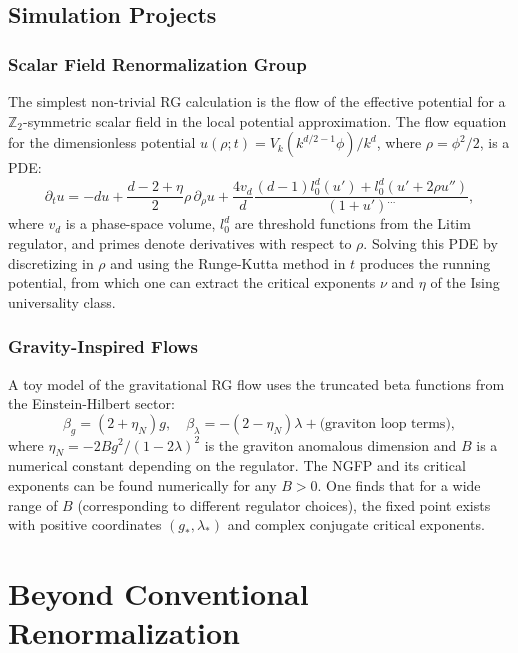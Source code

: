 \documentclass[12pt,a4paper,oneside]{book}
\theoremstyle{definition}
\theoremstyle{plain}
\theoremstyle{remark}
\begin{document}
\chapter{Simulation Projects}

\section{Scalar Field Renormalization Group}

The simplest non-trivial RG calculation is the flow of the effective potential
for a $\mathbb{Z}_2$-symmetric scalar field in the local potential approximation.
The flow equation for the dimensionless potential $u(\rho; t) = V_k(k^{d/2-1}\phi)/k^d$,
where $\rho = \phi^2/2$, is a PDE:
\begin{equation}
\partial_t u = -du + \frac{d-2+\eta}{2}\rho\,\partial_\rho u
+ \frac{4v_d}{d}\frac{(d-1)l_0^d(u') + l_0^d(u' + 2\rho u'')}{(1+u')^{...}},
\end{equation}
where $v_d$ is a phase-space volume, $l_0^d$ are threshold functions from
the Litim regulator, and primes denote derivatives with respect to $\rho$.
Solving this PDE by discretizing in $\rho$ and using the Runge-Kutta method
in $t$ produces the running potential, from which one can extract the
critical exponents $\nu$ and $\eta$ of the Ising universality class.

\section{Gravity-Inspired Flows}

A toy model of the gravitational RG flow uses the truncated beta functions
from the Einstein-Hilbert sector:
\begin{equation}
\beta_g = (2 + \eta_N)g, \quad
\beta_\lambda = -(2-\eta_N)\lambda + \text{(graviton loop terms)},
\end{equation}
where $\eta_N = -2Bg^2/(1-2\lambda)^2$ is the graviton anomalous dimension
and $B$ is a numerical constant depending on the regulator. The NGFP and its
critical exponents can be found numerically for any $B > 0$. One finds that
for a wide range of $B$ (corresponding to different regulator choices), the
fixed point exists with positive coordinates $(g_*, \lambda_*)$ and complex
conjugate critical exponents.

\part{Beyond Conventional Renormalization}
\end{document}
